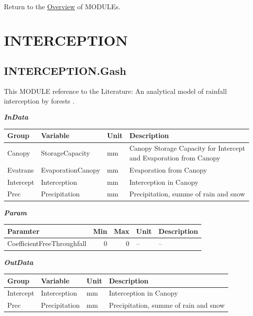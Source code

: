 \documentclass[
]{book}
\begin{document}
Return to the \protect\hyperlink{module}{Overview} of MODULEs.

\hypertarget{INTERCEPTION}{%
\section{INTERCEPTION}\label{INTERCEPTION}}

\hypertarget{INTERCEPTION.Gash}{%
\subsection{INTERCEPTION.Gash}\label{INTERCEPTION.Gash}}

This MODULE reference to the Literature: An analytical model of rainfall interception by forests \citep{Gash.1979}.

\textbf{\emph{InData}}

\begin{table}[!h]
\centering
\begin{tabular}{l|l|l|l}
\hline
Group & Variable & Unit & Description\\
\hline
Canopy & StorageCapacity & mm & Canopy Storage Capacity for Intercept and Evaporation from Canopy\\
\cline{1-4}
Evatrans & EvaporationCanopy & mm & Evaporation from Canopy\\
\cline{1-4}
Intercept & Interception & mm & Interception in Canopy\\
\cline{1-4}
Prec & Precipitation & mm & Precipitation, summe of rain and snow\\
\hline
\end{tabular}
\end{table}

\textbf{\emph{Param}}

\begin{table}[!h]
\centering
\begin{tabular}{l|r|r|l|l}
\hline
Paramter & Min & Max & Unit & Description\\
\hline
CoefficientFreeThroughfall & 0 & 0 & -- & --\\
\hline
\end{tabular}
\end{table}

\textbf{\emph{OutData}}

\begin{table}[!h]
\centering
\begin{tabular}{l|l|l|l}
\hline
Group & Variable & Unit & Description\\
\hline
Intercept & Interception & mm & Interception in Canopy\\
\cline{1-4}
Prec & Precipitation & mm & Precipitation, summe of rain and snow\\
\hline
\end{tabular}
\end{table}
\end{document}
